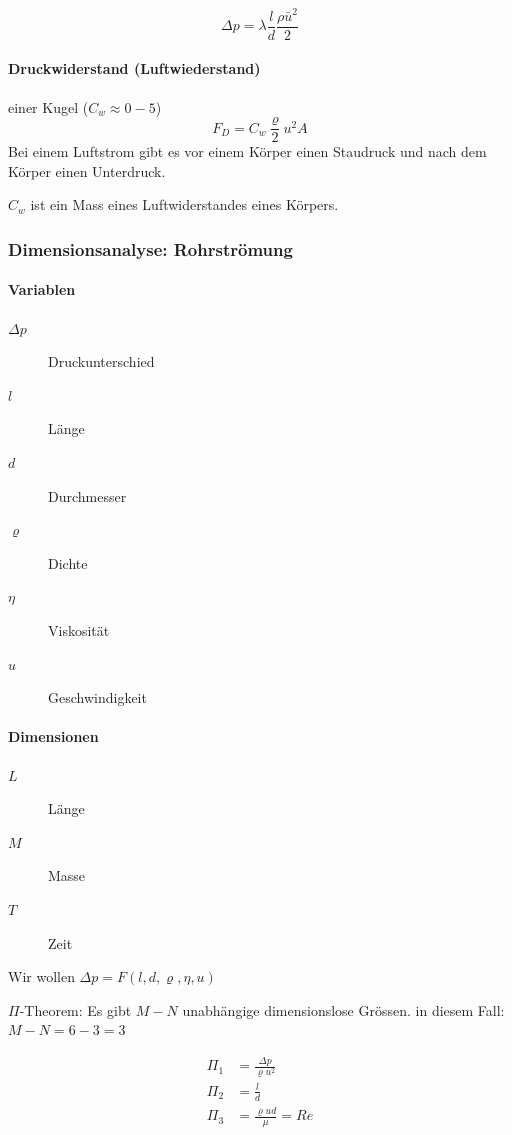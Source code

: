 \documentclass[a4paper]{scrartcl}
\begin{document}
	\[
		\Delta p = \lambda \frac{l}{d}\frac{\rho \bar{u}^2}{2}
	\]


\paragraph{Druckwiderstand (Luftwiederstand)} einer Kugel ($C_w \approx 0-5$)
	\[
		F_D = C_w \frac{\varrho}{2} u^2 A
	\]
	Bei einem Luftstrom gibt es vor einem Körper einen Staudruck und nach dem Körper einen Unterdruck.
	
	
	$C_w$ ist ein Mass eines Luftwiderstandes eines Körpers.


\subsubsection{Dimensionsanalyse: Rohrströmung}
	\paragraph{Variablen}
	\begin{description}
		\item[$\Delta p$] Druckunterschied
		\item[$l$] Länge
		\item[$d$] Durchmesser
		\item[$\varrho$] Dichte
		\item[$\eta$] Viskosität
		\item[$u$] Geschwindigkeit
	\end{description}
	
	\paragraph{Dimensionen}
	\begin{description}
		\item[$L$] Länge
		\item[$M$] Masse
		\item[$T$] Zeit
	\end{description}
	
	Wir wollen $\Delta p = F(l, d, \varrho, \eta, u)$
	
	
	$\Pi$-Theorem: Es gibt $M-N$ unabhängige dimensionslose Grössen. in diesem Fall: $M-N = 6-3 = 3$
	
	\begin{align*}
	\Pi_1 &= \frac{\Delta p}{\varrho u^2} \\
	\Pi_2 &= \frac{l}{d} \\
	\Pi_3 &= \frac{\varrho u d}{\mu} = Re
	\end{align*}
	
\end{document}
